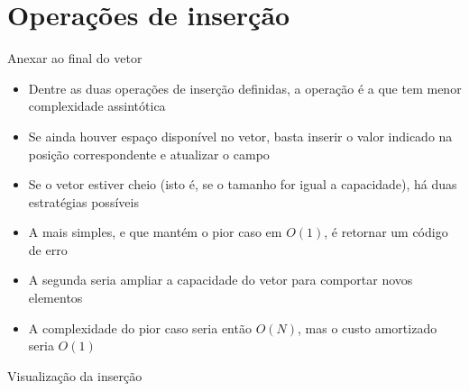 \section{Operações de inserção}

\begin{frame}[fragile]{Anexar ao final do vetor}

    \begin{itemize}
        \item Dentre as duas operações de inserção definidas, a operação
         é a que tem menor complexidade assintótica

        \item Se ainda houver espaço disponível no vetor, basta inserir o valor
        indicado na posição correspondente e atualizar o campo 

        \item Se o vetor estiver cheio (isto é, se o tamanho for igual a capacidade), há 
        duas estratégias possíveis

        \item A mais simples, e que mantém o pior caso em $O(1)$, é retornar um código de erro

        \item A segunda seria ampliar a capacidade do vetor para comportar novos elementos

        \item A complexidade do pior caso seria então $O(N)$, mas o custo amortizado seria
        $O(1)$
    \end{itemize}

\end{frame}

\begin{frame}[fragile]{Visualização da inserção}


\end{frame}

